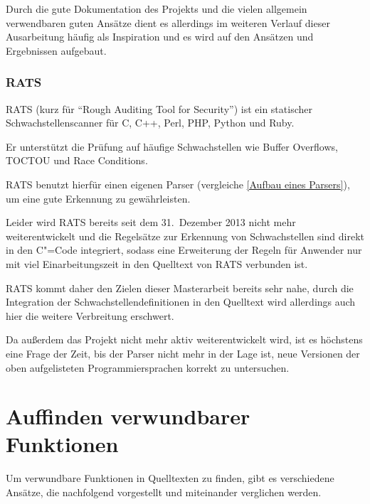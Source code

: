                 Durch die gute Dokumentation des Projekts und
                die vielen allgemein verwendbaren guten Ansätze dient es allerdings im weiteren Verlauf dieser Ausarbeitung häufig als Inspiration und
                es wird auf den Ansätzen und Ergebnissen aufgebaut.

            \subsubsection{RATS}
                RATS
                (kurz für
                \foreignquote{english}{Rough Auditing Tool for Security})\cite{SecureSoftware2013} ist ein statischer Schwachstellenscanner für C,
                C++,
                Perl,
                \gls{PHP},
                Python und
                Ruby.

                Er unterstützt die Prüfung auf häufige Schwachstellen wie Buffer Overflows,
                \gls{TOCTOU} und
                Race Conditions.

                RATS benutzt hierfür einen eigenen Parser
                (vergleiche
                \vref{Aufbau eines Parsers}),
                um eine gute Erkennung zu gewährleisten.

                Leider wird RATS bereits seit dem 31.~Dezember 2013 nicht mehr weiterentwickelt und
                die Regelsätze zur Erkennung von Schwachstellen sind direkt in den C"=Code integriert,
                sodass eine Erweiterung der Regeln für Anwender nur mit viel Einarbeitungszeit
                in den Quelltext von RATS verbunden ist.

                RATS kommt daher den Zielen dieser Masterarbeit bereits sehr nahe,
                durch die Integration der Schwachstellendefinitionen in den Quelltext wird allerdings auch hier die weitere Verbreitung erschwert.

                Da außerdem das Projekt nicht mehr aktiv weiterentwickelt wird,
                ist es höchstens eine Frage der Zeit,
                bis der Parser nicht mehr in der Lage ist,
                neue Versionen der oben aufgelisteten Programmiersprachen korrekt zu untersuchen.

    \section{Auffinden verwundbarer Funktionen}\label{Auffinden verwundbarer Funktionen}
        Um verwundbare Funktionen in Quelltexten zu finden,
        gibt es verschiedene Ansätze,
        die nachfolgend vorgestellt und
        miteinander verglichen werden.


